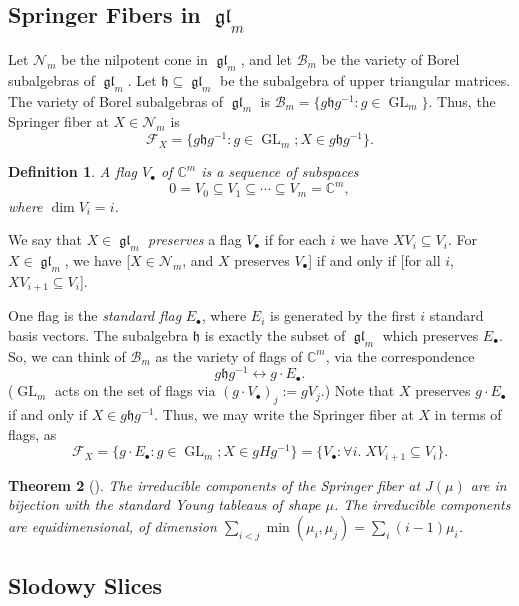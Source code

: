 \documentclass[12pt,psamsfonts]{article}
\DeclareMathOperator{\GL}{GL}
\DeclareMathOperator{\gl}{\mathfrak{gl}}
\newtheorem{theorem}{Theorem}[section]
\newtheorem{definition}[theorem]{Definition}
\begin{document}
\subsection{Springer Fibers in \texorpdfstring{\(\gl_m\)}{gl\_m}}
Let \(\mathcal{N}_m\) be the nilpotent cone in \(\gl_m\), and let \(\mathcal{B}_m\) be the variety of Borel subalgebras of \(\gl_m\).
Let \(\mathfrak{h} \subseteq \gl_m\) be the subalgebra of upper triangular matrices.
The variety of Borel subalgebras of \(\gl_m\) is \(\mathcal{B}_m = \{g\mathfrak{h}g^{-1} : g \in \GL_m\}\).
Thus, the Springer fiber at \(X \in \mathcal{N}_m\) is 
\[\mathcal{F}_X = \{g\mathfrak{h}g^{-1} : g \in \GL_m; X \in g\mathfrak{h}g^{-1}\}.\]
\begin{definition}
    A \emph{flag} \(V_\bullet\) of \(\mathbb{C}^m\) is a sequence of subspaces
    \[0 = V_0 \subseteq V_1 \subseteq \cdots \subseteq V_m = \mathbb{C}^m,\]
    where \(\dim V_i = i\).
\end{definition}
We say that \(X \in \gl_m\) \emph{preserves} a flag \(V_\bullet\) if for each \(i\) we have \(XV_i \subseteq V_i\).
For \(X \in \gl_m\), we have [\(X \in \mathcal{N}_m\), and \(X\) preserves \(V_\bullet\)] if and only if [for all \(i\), \(XV_{i + 1} \subseteq V_i\)].
\par One flag is the \emph{standard flag} \(E_\bullet\), where \(E_i\) is generated by the first \(i\) standard basis vectors.
The subalgebra \(\mathfrak{h}\) is exactly the subset of \(\gl_m\) which preserves \(E_\bullet\).
So, we can think of \(\mathcal{B}_m\) as the variety of flags of \(\mathbb{C}^m\), via the correspondence 
\[g\mathfrak{h}g^{-1} \leftrightarrow g \cdot E_\bullet.\]
(\(\GL_m\) acts on the set of flags via \((g \cdot V_\bullet)_j := gV_j\).)
Note that \(X\) preserves \(g \cdot E_\bullet\) if and only if \(X \in g \mathfrak{h} g^{-1}\).
Thus, we may write the Springer fiber at \(X\) in terms of flags, as 
\[\mathcal{F}_X = \{g \cdot E_\bullet : g \in \GL_m; X \in gHg^{-1}\} = \{V_\bullet : \forall i. \; XV_{i + 1} \subseteq V_i\}.\]

\begin{theorem}[{\cite[2.1]{springer_fiber}}]\label{usual_springer_fiber}
    The irreducible components of the Springer fiber at \(J(\mu)\) are in bijection with the standard Young tableaus of shape \(\mu\).
    The irreducible components are equidimensional, of dimension \(\sum_{i < j} \min(\mu_i, \mu_j) = \sum_i (i - 1) \mu_i\).
\end{theorem}

\subsection{Slodowy Slices}
\end{document}

